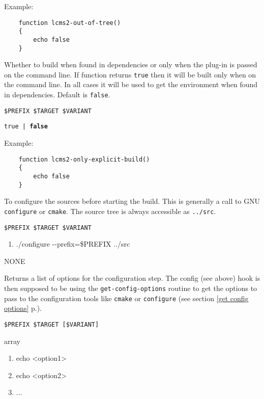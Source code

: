 \documentclass[a4paper,12pt,twoside]{article}
\newcommand{\code}[1]{\texttt{#1}}
\newcommand{\seeref}[1]{see section \ref{#1} p.\pageref{#1}}
\newcommand{\ddash}{-{}-}
\begin{document}
\begin{description}[font=\large\texttt]
	Example:
	\begin{lstlisting}
	function lcms2-out-of-tree()
	{
		echo false
	}
	\end{lstlisting}

	\item[<module>{[}-<variant>{]}-only-explicit-build] Whether to build when found in dependencies or only when the plug-in is passed on the command line. If function returns \code{true} then it will be built only when on the command line. In all cases it will be used to get the environment when found in dependencies. Default is \code{false}.
	\begin{description}[font=\textit,style=standard]
		\item[parameter] \tabto{2cm} \code{\$PREFIX \$TARGET \$VARIANT}
		\item[return] \tabto{2cm} \code{true | \textbf{false}}
	\end{description}

	Example:
	\begin{lstlisting}
	function lcms2-only-explicit-build()
	{
		echo false
	}
	\end{lstlisting}

	\item[<module>{[}-<variant>{]}-config] To configure the sources before starting the build. This is generally a call to GNU \code{configure} or \code{cmake}. The source tree is always accessible as \code{../src}.
	\begin{description}[font=\textit,style=standard]
		\item[parameter] \tabto{2cm} \code{\$PREFIX \$TARGET \$VARIANT}
		\begin{enumerate}
			\item ./configure \ddash{}prefix=\$PREFIX ../src
		\end{enumerate}
		\item[return] \tabto{2cm} NONE
	\end{description}

	\item[<module>{[}-common|<variant>{]}-config-options] Returns a list of options for the configuration step. The config (see above) hook is then supposed to be using the \code{get-config-options} routine to get the options to pass to the configuration tools like \code{cmake} or \code{configure} (\seeref{get config options}).
	\begin{description}[font=\textit,style=standard]
		\item[parameter] \tabto{2cm} \code{\$PREFIX \$TARGET [\$VARIANT]}
		\item[return] \tabto{2cm} array
		\begin{enumerate}
			\item echo <option1>
			\item echo <option2>
			\item ...
		\end{enumerate}
	\end{description}


\end{description}
\end{document}
